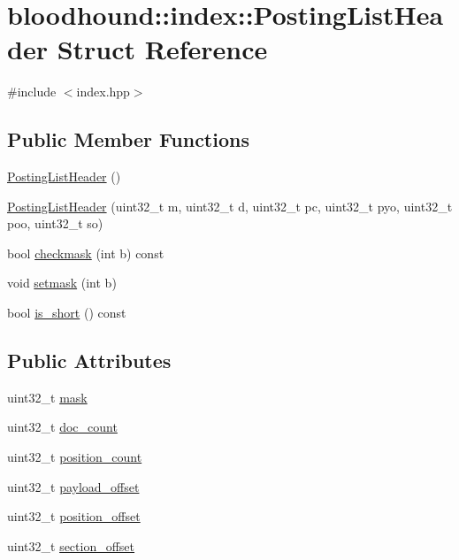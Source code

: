 \hypertarget{structbloodhound_1_1index_1_1PostingListHeader}{}\section{bloodhound\+:\+:index\+:\+:Posting\+List\+Header Struct Reference}
\label{structbloodhound_1_1index_1_1PostingListHeader}


{\ttfamily \#include $<$index.\+hpp$>$}

\subsection*{Public Member Functions}
\begin{DoxyCompactItemize}
\item 
\hyperlink{structbloodhound_1_1index_1_1PostingListHeader_a839dc96a649a6a5b381b4e9b93b6e59e}{Posting\+List\+Header} ()
\item 
\hyperlink{structbloodhound_1_1index_1_1PostingListHeader_a9aec6f6c7099b8ea249dc8af709c2125}{Posting\+List\+Header} (uint32\+\_\+t m, uint32\+\_\+t d, uint32\+\_\+t pc, uint32\+\_\+t pyo, uint32\+\_\+t poo, uint32\+\_\+t so)
\item 
bool \hyperlink{structbloodhound_1_1index_1_1PostingListHeader_a4202dde165e19c7dceec520a19d753e9}{checkmask} (int b) const
\item 
void \hyperlink{structbloodhound_1_1index_1_1PostingListHeader_ab9bb3cd3201527041e86a7fec0bd385d}{setmask} (int b)
\item 
bool \hyperlink{structbloodhound_1_1index_1_1PostingListHeader_acf8fd2592a71083d37bb7bb58fc8c544}{is\+\_\+short} () const
\end{DoxyCompactItemize}
\subsection*{Public Attributes}
\begin{DoxyCompactItemize}
\item 
uint32\+\_\+t \hyperlink{structbloodhound_1_1index_1_1PostingListHeader_a18fbb5f0675f6e59844b599950809bb0}{mask}
\item 
uint32\+\_\+t \hyperlink{structbloodhound_1_1index_1_1PostingListHeader_ac22a6d1974badac6cbedfb69f9c9bf5c}{doc\+\_\+count}
\item 
uint32\+\_\+t \hyperlink{structbloodhound_1_1index_1_1PostingListHeader_a88360105ba2e46000621f5bb74b4269c}{position\+\_\+count}
\item 
uint32\+\_\+t \hyperlink{structbloodhound_1_1index_1_1PostingListHeader_ab4ff4ee2a0aa56e03d315f6e60adf345}{payload\+\_\+offset}
\item 
uint32\+\_\+t \hyperlink{structbloodhound_1_1index_1_1PostingListHeader_a656267fe79315c04f431f99c1c826fec}{position\+\_\+offset}
\item 
uint32\+\_\+t \hyperlink{structbloodhound_1_1index_1_1PostingListHeader_a0c073440a09f22e0e277d3935d6b9158}{section\+\_\+offset}
\end{DoxyCompactItemize}



